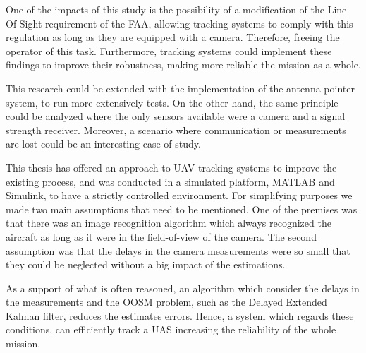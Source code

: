 One of the impacts of this study is the possibility of a modification of the Line-Of-Sight requirement of the FAA, allowing tracking systems to comply with this regulation as long as they are equipped with a camera. Therefore, freeing the operator of this task. Furthermore, tracking systems could implement these findings to improve their robustness, making more reliable the mission as a whole.

This research could be extended with the implementation of the antenna pointer system, to run more extensively tests. On the other hand, the same principle could be analyzed where the only sensors available were a camera and a signal strength receiver. Moreover, a scenario where communication or measurements are lost could be an interesting case of study.

This thesis has offered an approach to UAV tracking systems to improve the existing process, and was conducted in a simulated platform, MATLAB and Simulink, to have a strictly controlled environment. For simplifying purposes we made two main assumptions that need to be mentioned. One of the premises was that there was an image recognition algorithm which always recognized the aircraft as long as it were in the field-of-view of the camera. The second assumption was that the delays in the camera measurements were so small that they could be neglected without a big impact of the estimations.

As a support of what is often reasoned, an algorithm which consider the delays in the measurements and the OOSM problem, such as the Delayed Extended Kalman filter, reduces the estimates errors. Hence, a system which regards these conditions, can efficiently track a UAS increasing the reliability of the whole mission.
